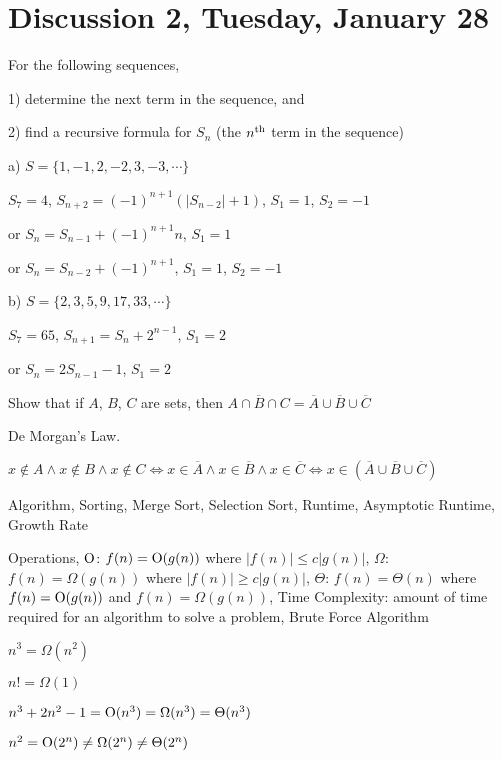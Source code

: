 \section{Discussion 2, Tuesday, January 28}

\begin{prob}

For the following sequences,

1) determine the next term in the sequence, and

2) find a recursive formula for $S_n$ (the $n^{\rm th}$ term in the sequence)

a) $S = \{1, -1, 2, -2, 3, -3, \cdots\}$

$S_7 = 4$, $S_{n + 2} = (-1)^{n + 1} (|S_{n - 2}| + 1)$, $S_1 = 1$, $S_2 = -1$

or $S_n = S_{n - 1} + (-1)^{n + 1} n$, $S_1 = 1$

or $S_n = S_{n - 2} + (-1)^{n + 1}$, $S_1 = 1$, $S_2 = -1$

b) $S = \{2, 3, 5, 9, 17, 33, \cdots\}$

$S_7 = 65$, $S_{n + 1} = S_{n} + 2^{n - 1}$, $S_1 = 2$

or $S_n = 2S_{n - 1} - 1$, $S_1 = 2$
\end{prob}

\begin{prob}
Show that if $A$, $B$, $C$ are sets, then ${\overline {A \cap B \cap C}} = {\overline A} \cup {\overline B} \cup {\overline C}$

De Morgan's Law.

$x \notin A \land x \notin B \land x \notin C \Leftrightarrow x \in \overline A \land x \in \overline B \land x \in \overline C \Leftrightarrow x \in ({\overline A} \cup {\overline B} \cup {\overline C})$

\end{prob}

Algorithm, Sorting, Merge Sort, Selection Sort, Runtime, Asymptotic Runtime, Growth Rate

Operations, ${\rm O}$: $f(n) = {\rm O}(g(n))$ where $|f(n)| \leq c|g(n)|$, $\Omega$: $f(n) = \Omega(g(n))$ where $|f(n)| \geq c|g(n)|$, $\Theta$: $f(n) = \Theta(n)$ where $f(n) = {\rm O}(g(n))$ and $f(n) = \Omega(g(n))$, Time Complexity: amount of time required for an algorithm to solve a problem, Brute Force Algorithm

\begin{ex}
$n^3 = \Omega(n^2)$
\end{ex}

\begin{ex}
$n! = \Omega(1)$
\end{ex}

\begin{ex}
$n^3 + 2n^2 - 1 = {\rm O}(n^3) = \Omega(n^3) = \Theta(n^3)$
\end{ex}

\begin{ex}
$n^2 = {\rm O}(2^n) \neq \Omega(2^n) \neq \Theta(2^n)$
\end{ex}





